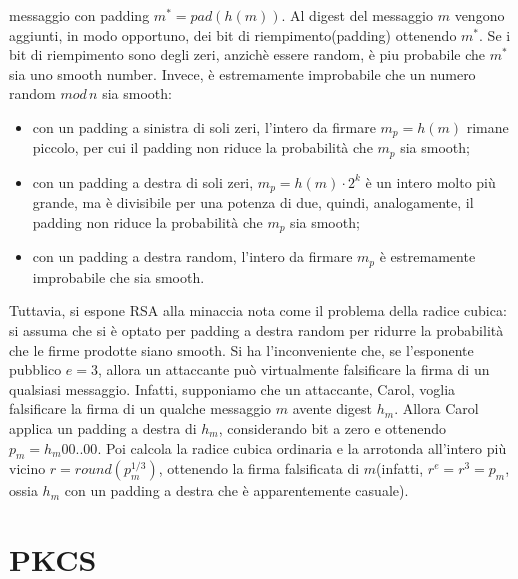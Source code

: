 messaggio con padding $m^{*} = pad(h(m))$. Al digest del messaggio $m$ vengono aggiunti, in modo opportuno, dei bit di riempimento(padding) ottenendo $m^*$. Se i bit di riempimento sono degli zeri, anzichè essere random, è piu probabile che $m^*$ sia uno smooth number. Invece, è estremamente improbabile che un numero random $mod \, n$ sia smooth: \begin{itemize}
\item con un padding a sinistra di soli zeri, l'intero da firmare $m_{p} = h(m)$ rimane piccolo, per cui il padding non riduce la probabilità che $m_{p}$ sia smooth;
\item con un padding a destra di soli zeri, $m_{p} = h(m) \cdot 2^k $ è un intero molto più grande, ma è divisibile per una potenza di due, quindi, analogamente, il padding non riduce la probabilità che $m_{p}$ sia smooth;
\item con un padding a destra random, l'intero da firmare $m_{p}$ è estremamente improbabile che sia smooth. 
\end{itemize}
Tuttavia, si espone RSA alla minaccia nota come il
problema della radice cubica: si assuma che si è optato per padding a destra random per ridurre la probabilità che le firme prodotte siano smooth. Si ha l'inconveniente che, se l'esponente pubblico $e = 3$, allora un attaccante può virtualmente falsificare la
firma di un qualsiasi messaggio. Infatti, supponiamo che un attaccante, Carol, voglia falsificare la firma di un qualche messaggio $m$ avente digest $h_{m}$. Allora Carol applica un padding a destra di $h_{m}$, considerando bit a zero e ottenendo $p_{m} = h_{m}00..00$. Poi calcola la radice cubica ordinaria e la arrotonda all'intero più vicino $r = round(p_{m}^{1/3})$, ottenendo la firma falsificata di $m$(infatti, $r^e = r^3 = p_{m}$, ossia $h_{m}$ con un padding a destra che è apparentemente casuale).

\section{PKCS}

